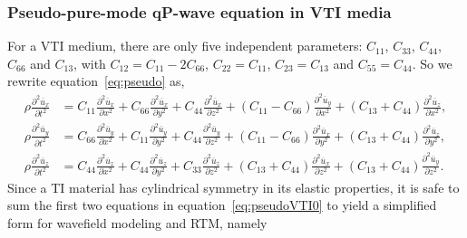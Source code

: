 \subsubsection{Pseudo-pure-mode qP-wave equation in VTI media}
For a VTI medium, there are only five independent parameters: $C_{11}$, $C_{33}$, $C_{44}$, $C_{66}$ and $C_{13}$, 
with $C_{12}=C_{11}-2C_{66}$, $C_{22}=C_{11}$, $C_{23}=C_{13}$ and $C_{55}=C_{44}$.
 So we rewrite equation~\ref{eq:pseudo} as,
\begin{equation}
\label{eq:pseudoVTI0}
\begin{split}
\rho\frac{\partial^2{\overline{u}_x}}{\partial t^2} &= C_{11}\frac{\partial^2{\overline{u}_x}}{\partial x^2}
                                         + C_{66}\frac{\partial^2{\overline{u}_x}}{\partial y^2}
                                         + C_{44}\frac{\partial^2{\overline{u}_x}}{\partial z^2}
                                         +(C_{11}-C_{66})\frac{\partial^2{\overline{u}_y}}{\partial x^2}
                                         +(C_{13}+C_{44})\frac{\partial^2{\overline{u}_z}}{\partial x^2}, \\
\rho\frac{\partial^2{\overline{u}_y}}{\partial t^2} &= C_{66}\frac{\partial^2{\overline{u}_y}}{\partial x^2}
                                         + C_{11}\frac{\partial^2{\overline{u}_y}}{\partial y^2}
                                         + C_{44}\frac{\partial^2{\overline{u}_y}}{\partial z^2} 
                                         +(C_{11}-C_{66})\frac{\partial^2{\overline{u}_x}}{\partial y^2}
                                         +(C_{13}+C_{44})\frac{\partial^2{\overline{u}_z}}{\partial y^2}, \\
\rho\frac{\partial^2{\overline{u}_z}}{\partial t^2} &= C_{44}\frac{\partial^2{\overline{u}_z}}{\partial x^2}
                                         + C_{44}\frac{\partial^2{\overline{u}_z}}{\partial y^2}
                                         + C_{33}\frac{\partial^2{\overline{u}_z}}{\partial z^2} 
                                         +(C_{13}+C_{44})\frac{\partial^2{\overline{u}_x}}{\partial z^2}
                                         +(C_{13}+C_{44})\frac{\partial^2{\overline{u}_y}}{\partial z^2}.
\end{split}
\end{equation}
Since a TI material has cylindrical symmetry in its elastic properties, it is safe to sum the first two equations
 in equation~\ref{eq:pseudoVTI0} to yield a simplified form for wavefield modeling and RTM, namely
